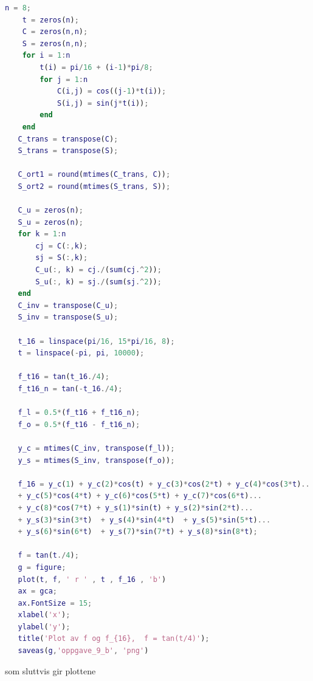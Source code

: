 \documentclass[12pt,
               a4paper,
               article,
               oneside,
               oldfontcommands,
               norsk]{memoir}
\begin{document}
\begin{lstlisting}[language=MATLAB]
    n = 8;
    t = zeros(n);
    C = zeros(n,n);
    S = zeros(n,n);
    for i = 1:n
        t(i) = pi/16 + (i-1)*pi/8;
        for j = 1:n
            C(i,j) = cos((j-1)*t(i));
            S(i,j) = sin(j*t(i));
        end
    end
   C_trans = transpose(C);
   S_trans = transpose(S);
   
   C_ort1 = round(mtimes(C_trans, C));
   S_ort2 = round(mtimes(S_trans, S));  
   
   C_u = zeros(n);
   S_u = zeros(n);
   for k = 1:n
       cj = C(:,k);
       sj = S(:,k);
       C_u(:, k) = cj./(sum(cj.^2));
       S_u(:, k) = sj./(sum(sj.^2));
   end
   C_inv = transpose(C_u);
   S_inv = transpose(S_u);
   
   t_16 = linspace(pi/16, 15*pi/16, 8);
   t = linspace(-pi, pi, 10000);
   
   f_t16 = tan(t_16./4);
   f_t16_n = tan(-t_16./4);
   
   f_l = 0.5*(f_t16 + f_t16_n);
   f_o = 0.5*(f_t16 - f_t16_n);
   
   y_c = mtimes(C_inv, transpose(f_l));
   y_s = mtimes(S_inv, transpose(f_o));
   
   f_16 = y_c(1) + y_c(2)*cos(t) + y_c(3)*cos(2*t) + y_c(4)*cos(3*t)... 
   + y_c(5)*cos(4*t) + y_c(6)*cos(5*t) + y_c(7)*cos(6*t)... 
   + y_c(8)*cos(7*t) + y_s(1)*sin(t) + y_s(2)*sin(2*t)... 
   + y_s(3)*sin(3*t)  + y_s(4)*sin(4*t)  + y_s(5)*sin(5*t)...  
   + y_s(6)*sin(6*t)  + y_s(7)*sin(7*t) + y_s(8)*sin(8*t);

   f = tan(t./4);
   g = figure;
   plot(t, f, ' r ' , t , f_16 , 'b')
   ax = gca;
   ax.FontSize = 15;
   xlabel('x');
   ylabel('y');
   title('Plot av f og f_{16},  f = tan(t/4)');
   saveas(g,'oppgave_9_b', 'png')
\end{lstlisting}
som sluttvis gir plottene
\end{document}
